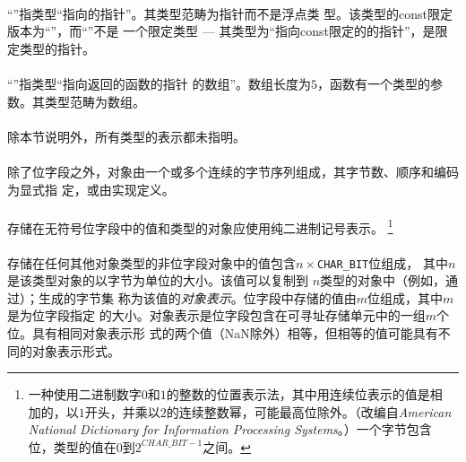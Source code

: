 {\paragraph{}
\ex ``''指类型``指向的指针''。其类型范畴为指针而不是浮点类
型。该类型的const限定版本为``''，而``''不是
一个限定类型 --- 其类型为``指向const限定的的指针''，是限定类型的指针。

\paragraph{}
\ex ``''指类型``指向返回的函数的指针
的数组''。数组长度为$5$，函数有一个类型的参数。其类型范畴为数组。


\paragraph{}
除本节说明外，所有类型的表示都未指明。

\paragraph{}
除了位字段之外，对象由一个或多个连续的字节序列组成，其字节数、顺序和编码为显式指
定，或由实现定义。

\paragraph{}
存储在无符号位字段中的值和类型的对象应使用纯二进制记号表示。
\footnote{一种使用二进制数字$0$和$1$的整数的位置表示法，其中用连续位表示的值是相
加的，以$1$开头，并乘以$2$的连续整数幂，可能最高位除外。（改编自\textit{American
National Dictionary for Information Processing Systems}。）一个字节包含
位，类型的值在$0$到$2^{CHAR\_BIT-1}$之间。}

\paragraph{}
存储在任何其他对象类型的非位字段对象中的值包含$n\times$\texttt{CHAR\_BIT}位组成，
其中$n$是该类型对象的以字节为单位的大小。该值可以复制到
\tm{unsigned char[}$n$\tm{]}类型的对象中（例如，通过）；生成的字节集
称为该值的\textit{对象表示}。位字段中存储的值由$m$位组成，其中$m$是为位字段指定
的大小。对象表示是位字段包含在可寻址存储单元中的一组$m$个位。具有相同对象表示形
式的两个值（NaN除外）相等，但相等的值可能具有不同的对象表示形式。

}
